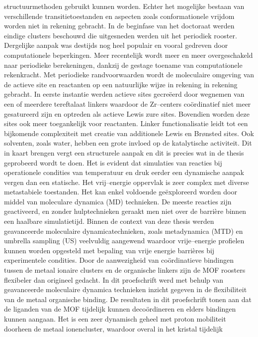 structuurmethoden gebruikt kunnen worden. Echter het mogelijke bestaan van
verschillende transitietoestanden en aspecten zoals conformationele vrijdom worden niet in rekening gebracht. In de beginfase van het doctoraat werden eindige clusters beschouwd die 
uitgesneden werden uit het periodiek rooster. Dergelijke aanpak was destijds nog heel populair en vooral gedreven door computationele beperkingen. 
Meer recentelijk wordt meer en meer overgeschakeld naar periodieke berekeningen, dankzij de gestage toename van computationele rekenkracht. 
Met periodieke randvoorwaarden wordt de moleculaire omgeving van de actieve site en reactanten op een natuurlijke wijze in rekening in rekening gebracht. 
In eerste instantie werden actieve sites gecre\"eerd door wegnemen van een of
meerdere tereftalaat linkers waardoor de Zr--centers co\"ordinatief niet meer
gesatureerd zijn en optreden als actieve Lewis zure sites. Bovendien worden deze sites ook meer toegankelijk voor reactanten. 
Linker functionalisatie leidt tot een bijkomende complexiteit met creatie van
additionele Lewis en Br\o{}nsted sites. Ook solventen, zoals water, hebben een
grote invloed op de katalytische activiteit. Dit in kaart brengen vergt een structurele 
aanpak en dit is precies wat in de thesis geprobeerd wordt te doen. 
\npar
Het is evident dat simulaties van reacties bij operationele condities van
temperatuur en druk eerder een dynamische aanpak vergen dan een statische.
Het vrij--energie oppervlak is zeer complex met diverse metastabiele toestanden.
Het kan enkel voldoende ge\"exploreerd worden door middel van moleculare
dynamica (MD) technieken. De meeste reacties zijn geactiveerd, en zonder
hulptechnieken geraakt men niet over de barri\`ere binnen een haalbare
simulatietijd. Binnen de context van deze thesis werden geavanceerde moleculaire
dynamicatechnieken, zoals metadynamica (MTD) en umbrella sampling (US) veelvuldig aangewend waardoor
vrije--energie profielen kunnen worden opgesteld met bepaling van vrije energie
barri\`eres bij experimentele condities. Door de aanwezigheid van
co\"ordinatieve bindingen tussen de metaal ionaire clusters en de organische linkers zijn de MOF roosters flexibeler dan origineel gedacht. 
In dit proefschrift werd met behulp van geavanceerde moleculaire dynamica technieken inzicht gegeven in de flexibiliteit van de metaal organische binding. 
De resultaten in dit proefschrift tonen aan dat de liganden van de MOF tijdelijk
kunnen deco\"ordineren en elders bindingen kunnen aangaan. Het is een zeer
dynamisch geheel met proton mobiliteit doorheen de metaal ionencluster, waardoor overal in het kristal tijdelijk 
